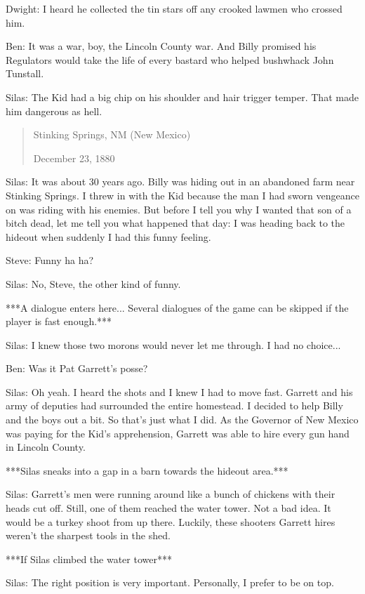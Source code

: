 \documentclass{article}
\begin{document}
Dwight: I heard he collected the tin stars off any crooked lawmen who crossed him.

Ben: It was a war, boy, the Lincoln County war. And Billy promised his Regulators would take the life of every bastard who helped bushwhack John Tunstall.

Silas: The Kid had a big chip on his shoulder and hair trigger temper. That made him dangerous as hell.

\begin{quote}
    Stinking Springs, NM (New Mexico)

    December 23, 1880
\end{quote}

Silas: It was about 30 years ago. Billy was hiding out in an abandoned farm near Stinking Springs. I threw in with the Kid because the man I had sworn vengeance on was riding with his enemies. But before I tell you why I wanted that son of a bitch dead, let me tell you what happened that day: I was heading back to the hideout when suddenly I had this funny feeling.

Steve: Funny ha ha?

Silas: No, Steve, the other kind of funny.

***A dialogue enters here... Several dialogues of the game can be skipped if the player is fast enough.***

Silas: I knew those two morons would never let me through. I had no choice...

Ben: Was it Pat Garrett's posse?

Silas: Oh yeah. I heard the shots and I knew I had to move fast. Garrett and his army of deputies had surrounded the entire homestead. I decided to help Billy and the boys out a bit. So that's just what I did. As the Governor of New Mexico was paying for the Kid's apprehension, Garrett was able to hire every gun hand in Lincoln County.

***Silas sneaks into a gap in a barn towards the hideout area.***

Silas: Garrett's men were running around like a bunch of chickens with their heads cut off. Still, one of them reached the water tower. Not a bad idea. It would be a turkey shoot from up there. Luckily, these shooters Garrett hires weren't the sharpest tools in the shed.

***If Silas climbed the water tower***

Silas: The right position is very important. Personally, I prefer to be on top.
\end{document}
